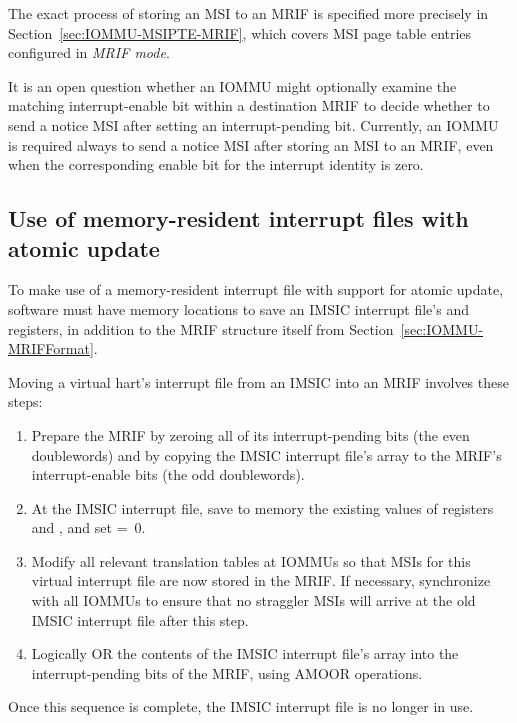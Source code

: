 The exact process of storing an MSI to an MRIF is specified more
precisely in Section~\ref{sec:IOMMU-MSIPTE-MRIF}, which covers MSI page
table entries configured in \emph{MRIF mode}.

\begin{commentary}
It is an open question whether an \mbox{IOMMU} might optionally examine
the matching interrupt-enable bit within a destination MRIF to decide
whether to send a notice MSI after setting an interrupt-pending bit.
Currently, an \mbox{IOMMU} is required always to send a notice MSI after
storing an MSI to an MRIF, even when the corresponding enable bit for
the interrupt identity is zero.
\end{commentary}

\subsection{Use of memory-resident interrupt files with atomic update}

To make use of a memory-resident interrupt file with support for atomic
update, software must have memory locations to save an IMSIC interrupt
file's  and  registers, in addition to the
MRIF structure itself from Section~\ref{sec:IOMMU-MRIFFormat}.

Moving a virtual hart's interrupt file from an IMSIC into an MRIF
involves these steps:
\begin{enumerate}

\item
Prepare the MRIF by zeroing all of its interrupt-pending bits (the even
doublewords) and by copying the IMSIC interrupt file's  array to
the MRIF's interrupt-enable bits (the odd doublewords).

\item
At the IMSIC interrupt file, save to memory the existing values of
registers  and , and set 
=~0.

\item
Modify all relevant translation tables at \mbox{IOMMU}s so that MSIs for
this virtual interrupt file are now stored in the MRIF.
If necessary, synchronize with all \mbox{IOMMU}s to ensure that no straggler
MSIs will arrive at the old IMSIC interrupt file after this step.

\item
Logically OR the contents of the IMSIC interrupt file's  array
into the interrupt-pending bits of the MRIF, using AMOOR operations.

\end{enumerate}
Once this sequence is complete, the IMSIC interrupt file is no longer
in use.

